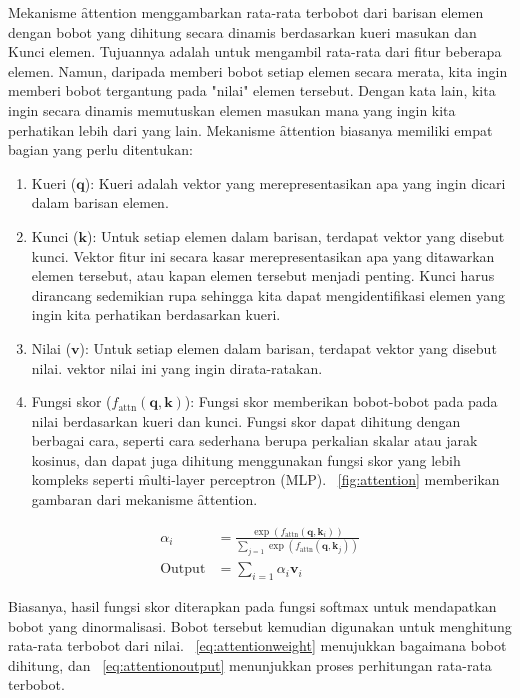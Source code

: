 Mekanisme \f{attention} menggambarkan rata-rata terbobot dari barisan elemen dengan bobot yang dihitung secara dinamis berdasarkan kueri masukan dan Kunci elemen. Tujuannya adalah untuk mengambil rata-rata dari fitur beberapa elemen. Namun, daripada memberi bobot setiap elemen secara merata, kita ingin memberi bobot tergantung pada "nilai" elemen tersebut. Dengan kata lain, kita ingin secara dinamis memutuskan elemen masukan mana yang ingin kita perhatikan lebih dari yang lain. Mekanisme \f{attention} biasanya memiliki empat bagian yang perlu ditentukan:

\begin{enumerate}
	\item Kueri ($\mathbf{q}$): Kueri adalah vektor yang merepresentasikan apa yang ingin dicari dalam barisan elemen.
	\item Kunci ($\mathbf{k}$): Untuk setiap elemen dalam barisan, terdapat vektor yang disebut kunci. Vektor fitur ini secara kasar merepresentasikan apa yang ditawarkan elemen tersebut, atau kapan elemen tersebut menjadi penting. Kunci harus dirancang sedemikian rupa sehingga kita dapat mengidentifikasi elemen yang ingin kita perhatikan berdasarkan kueri.
	\item Nilai ($\mathbf{v}$): Untuk setiap elemen dalam barisan, terdapat vektor yang disebut nilai. vektor nilai ini yang ingin dirata-ratakan.
	\item Fungsi skor ($f_{\text{attn}}(\mathbf{q}, \mathbf{k})$): Fungsi skor memberikan bobot-bobot pada pada nilai berdasarkan kueri dan kunci. Fungsi skor dapat dihitung dengan berbagai cara, seperti cara sederhana berupa perkalian skalar atau jarak kosinus, dan dapat juga dihitung menggunakan fungsi skor yang lebih kompleks seperti \f{multi-layer perceptron} (MLP). \pic~\ref{fig:attention} memberikan gambaran dari mekanisme \f{attention}.
\end{enumerate}

\noindent\begin{align}
	\alpha_i &= \frac{\exp(f_{\text{attn}}(\mathbf{q}, \mathbf{k}_i))}{\sum_{j=1}\exp(f_{\text{attn}}(\mathbf{q}, \mathbf{k}_j))} \label{eq:attentionweight}\\
	\text{Output} &= \sum_{i=1} \alpha_i \mathbf{v}_i \label{eq:attentionoutput}
\end{align}

Biasanya, hasil fungsi skor diterapkan pada fungsi softmax untuk mendapatkan bobot yang dinormalisasi. Bobot tersebut kemudian digunakan untuk menghitung rata-rata terbobot dari nilai. \equ~\ref{eq:attentionweight} menujukkan bagaimana bobot dihitung, dan \equ~\ref{eq:attentionoutput} menunjukkan proses perhitungan rata-rata terbobot.

